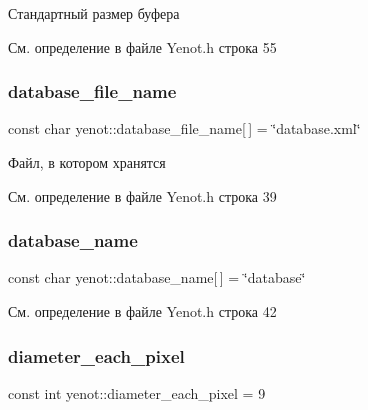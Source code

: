 Стандартный размер буфера 



См. определение в файле Yenot.\+h строка 55

\mbox{\label{namespaceyenot_ac18180ab326731ce58145fe9049c49b9}} 
\subsubsection{\texorpdfstring{database\+\_\+file\+\_\+name}{database\_file\_name}}
{\footnotesize\ttfamily const char yenot\+::database\+\_\+file\+\_\+name\mbox{[}$\,$\mbox{]} = \char`\"{}database.\+xml\char`\"{}}



Файл, в котором хранятся 



См. определение в файле Yenot.\+h строка 39

\mbox{\label{namespaceyenot_a5c402b62f742f34e9e42756075df6ed2}} 
\subsubsection{\texorpdfstring{database\+\_\+name}{database\_name}}
{\footnotesize\ttfamily const char yenot\+::database\+\_\+name\mbox{[}$\,$\mbox{]} = \char`\"{}database\char`\"{}}



См. определение в файле Yenot.\+h строка 42

\mbox{\label{namespaceyenot_a6c5730ae743bc1203438dfcf6f35faeb}} 
\subsubsection{\texorpdfstring{diameter\+\_\+each\+\_\+pixel}{diameter\_each\_pixel}}
{\footnotesize\ttfamily const int yenot\+::diameter\+\_\+each\+\_\+pixel = 9}



